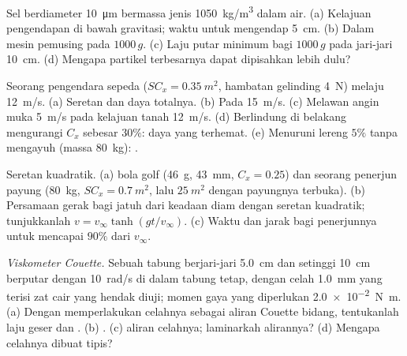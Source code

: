 \begin{exercise}[$\star\star$]\label{exo:b2:viscous-flows:6}
Sel berdiameter \qty{10}{\micro m} bermassa jenis \qty{1050}{kg/m^3} dalam air.
(a) Kelajuan pengendapan di bawah gravitasi; waktu untuk mengendap \qty{5}{cm}. (b) Dalam
mesin pemusing pada $1000\,g$. (c) Laju putar minimum bagi $1000\,g$ pada
jari-jari \qty{10}{cm}. (d) Mengapa partikel terbesarnya dapat dipisahkan lebih dulu?
\end{exercise}

\begin{exercise}[$\star\star$]\label{exo:b2:viscous-flows:7}
Seorang pengendara sepeda ($SC_x = \qty{0.35}{m^2}$, hambatan gelinding \qty{4}{N}) melaju
\qty{12}{m/s}. (a) Seretan dan daya totalnya. (b) Pada \qty{15}{m/s}. (c) Melawan
angin muka \qty{5}{m/s} pada kelajuan tanah \qty{12}{m/s}. (d) Berlindung di belakang mengurangi
$C_x$ sebesar $30\%$: daya yang terhemat. (e) Menuruni lereng $5\%$ tanpa mengayuh
(massa \qty{80}{kg}): .
\end{exercise}

\begin{exercise}[$\star\star$]\label{exo:b2:viscous-flows:8}
Seretan kuadratik. (a)  bola golf (\qty{46}{g}, \qty{43}{mm},
$C_x = 0.25$) dan seorang penerjun payung (\qty{80}{kg}, $SC_x = \qty{0.7}{m^2}$, lalu
$\qty{25}{m^2}$ dengan payungnya terbuka). (b) Persamaan gerak bagi jatuh
dari keadaan diam dengan seretan kuadratik; tunjukkanlah $v = v_\infty\tanh(gt/v_\infty)$. (c)
Waktu dan jarak bagi penerjunnya untuk mencapai $90\%$ dari $v_\infty$.
\end{exercise}

\begin{exercise}[$\star\star$]\label{exo:b2:viscous-flows:9}
\emph{Viskometer Couette.} Sebuah tabung berjari-jari \qty{5.0}{cm} dan setinggi
\qty{10}{cm} berputar dengan \qty{10}{rad/s} di dalam tabung tetap, dengan celah
\qty{1.0}{mm} yang terisi zat cair yang hendak diuji; momen gaya yang diperlukan
\qty{2.0e-2}{N.m}. (a) Dengan memperlakukan celahnya sebagai aliran Couette bidang, tentukanlah laju geser
dan . (b) . (c)  aliran celahnya;
laminarkah alirannya? (d) Mengapa celahnya dibuat tipis?
\end{exercise}

